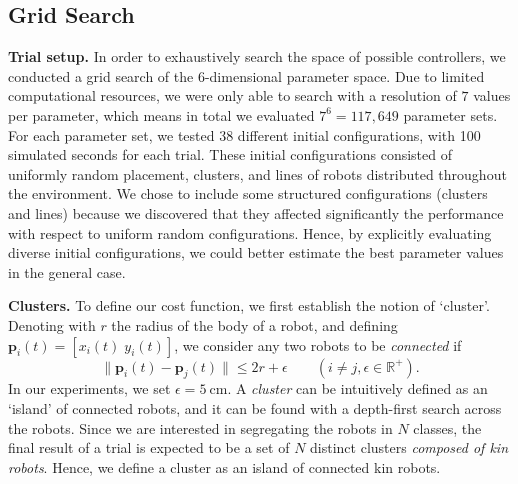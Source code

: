 \documentclass[conference]{IEEEtran}
\newcommand{\myparagraph}[1]{\textbf{#1.}}
\renewcommand{\vec}[1]{\ensuremath{\mathbf{#1}}}
\begin{document}
\subsection{Grid Search}
\label{sec:gridsearch}
  
\myparagraph{Trial setup}
In order to exhaustively search the space of possible controllers, we conducted
a grid search of the 6-dimensional parameter space. Due to limited computational
resources, we were only able to search with a resolution of $7$ values per
parameter, which means in total we evaluated $7^6=117,649$ parameter sets. For
each parameter set, we tested 38 different initial configurations, with 100
simulated seconds for each trial. These initial configurations consisted of
uniformly random placement, clusters, and lines of robots distributed throughout
the environment. We chose to include some structured configurations (clusters
and lines) because we discovered that they affected significantly the
performance with respect to uniform random configurations. Hence, by explicitly
evaluating diverse initial configurations, we could better estimate the best
parameter values in the general case.

\myparagraph{Clusters}
To define our cost function, we first establish the notion of
`cluster'. Denoting with $r$ the radius of the body of a robot, and defining
$\vec{p}_i(t) = [x_i(t)\;y_i(t)]$, we consider any two robots to be
\emph{connected} if
$$
\lVert\vec{p}_i(t) - \vec{p}_j(t)\rVert \le 2r + \epsilon \qquad (i \ne j, \epsilon \in \mathbb{R}^+).
$$
In our experiments, we set $\epsilon = \SI{5}{\centi\meter}$.  A
\emph{cluster} can be intuitively defined as an `island' of connected
robots, and it can be found with a depth-first search across the
robots. Since we are interested in segregating the robots in $N$
classes, the final result of a trial is expected to be a set of $N$
distinct clusters \emph{composed of kin robots}. Hence, we define a
cluster as an island of connected kin robots.
\end{document}
